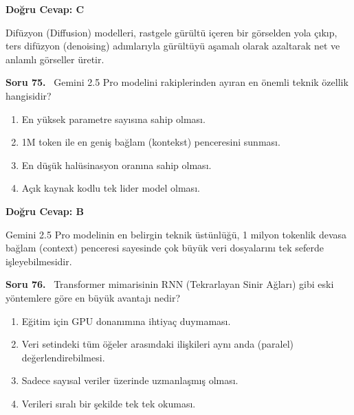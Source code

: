 \documentclass[11pt,a4paper,openany]{book}
\begin{document}
\vspace{4pt}
\begin{tcolorbox}[title=Cevap ve Açıklama, colback=gray!3!white, colframe=primarycolor!90!black, arc=2mm, fonttitle=\bfseries\sffamily, top=6pt, bottom=6pt]
    \textbf{Doğru Cevap: C}

    \vspace{2pt}
    Difüzyon (Diffusion) modelleri, rastgele gürültü içeren bir görselden yola çıkıp, ters difüzyon (denoising) adımlarıyla gürültüyü aşamalı olarak azaltarak net ve anlamlı görseller üretir.
\end{tcolorbox}
\vspace{10pt}
\needspace{5cm}
\vspace{8pt}
\noindent\textbf{\large\sffamily Soru 75.} \ Gemini 2.5 Pro modelini rakiplerinden ayıran en önemli teknik özellik hangisidir?

\begin{enumerate}[label=\Alph*), leftmargin=25pt, topsep=4pt, itemsep=2pt]
        \item En yüksek parametre sayısına sahip olması.
        \item 1M token ile en geniş bağlam (kontekst) penceresini sunması.
        \item En düşük halüsinasyon oranına sahip olması.
        \item Açık kaynak kodlu tek lider model olması.
\end{enumerate}

\vspace{4pt}
\begin{tcolorbox}[title=Cevap ve Açıklama, colback=gray!3!white, colframe=primarycolor!90!black, arc=2mm, fonttitle=\bfseries\sffamily, top=6pt, bottom=6pt]
    \textbf{Doğru Cevap: B}

    \vspace{2pt}
    Gemini 2.5 Pro modelinin en belirgin teknik üstünlüğü, 1 milyon tokenlik devasa bağlam (context) penceresi sayesinde çok büyük veri dosyalarını tek seferde işleyebilmesidir.
\end{tcolorbox}
\vspace{10pt}
\needspace{5cm}
\vspace{8pt}
\noindent\textbf{\large\sffamily Soru 76.} \ Transformer mimarisinin RNN (Tekrarlayan Sinir Ağları) gibi eski yöntemlere göre en büyük avantajı nedir?

\begin{enumerate}[label=\Alph*), leftmargin=25pt, topsep=4pt, itemsep=2pt]
        \item Eğitim için GPU donanımına ihtiyaç duymaması.
        \item Veri setindeki tüm öğeler arasındaki ilişkileri aynı anda (paralel) değerlendirebilmesi.
        \item Sadece sayısal veriler üzerinde uzmanlaşmış olması.
        \item Verileri sıralı bir şekilde tek tek okuması.
\end{enumerate}
\end{document}
